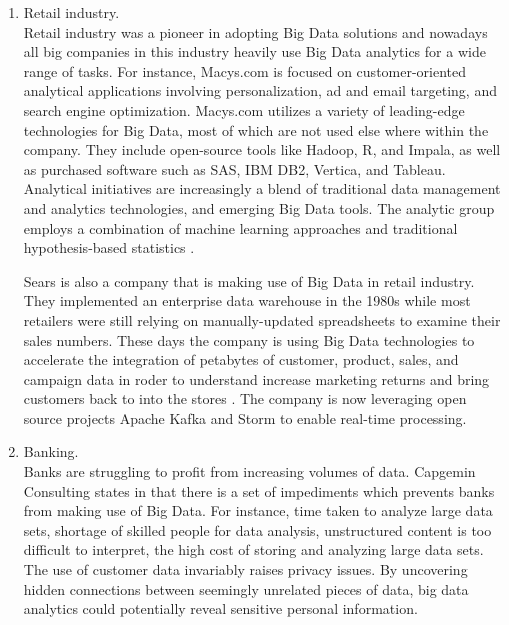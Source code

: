 \documentclass[runningheads]{llncs}
\begin{document}
\begin{enumerate}
\item Retail industry.\\

Retail industry was a pioneer in adopting Big Data solutions and nowadays all big companies in this industry heavily use Big Data analytics for a wide range of tasks. For instance, Macys.com is focused on customer-oriented analytical applications involving personalization, ad and email targeting, and search engine optimization. Macys.com utilizes a variety of leading-edge technologies for Big Data, most of which are not used else where within the company. They include open-source tools like Hadoop, R, and Impala, as well as purchased software such as SAS, IBM DB2, Vertica, and Tableau. Analytical initiatives are increasingly a blend of traditional data management and analytics technologies, and emerging Big Data tools. The analytic group employs a combination of machine learning approaches and traditional hypothesis-based statistics \cite{DAVENPORT}.

Sears is also a company that is making use of Big Data in retail industry. They implemented an enterprise data warehouse in the 1980s while most retailers were still relying on manually-updated spreadsheets to examine their sales numbers. These days the company is using Big Data technologies to accelerate the integration of petabytes of customer, product, sales, and campaign data in roder to understand increase marketing returns and bring customers back to into the stores \cite{DAVENPORT}. The company is now leveraging open source projects Apache Kafka and Storm to enable real-time processing.\\

\item Banking.\\

Banks are struggling to profit from increasing volumes of data. Capgemin Consulting states in \cite{} that there is a set of impediments which prevents banks from making use of Big Data. For instance, time taken to analyze large data sets, shortage of skilled people for data analysis, unstructured content is too difficult to interpret, the high cost of storing and analyzing large data sets.  The use of customer data invariably raises privacy issues. By uncovering
hidden connections between seemingly unrelated pieces of data, big data analytics could potentially reveal sensitive
personal information\cite{CAP}. 


\end{enumerate}
\end{document}
